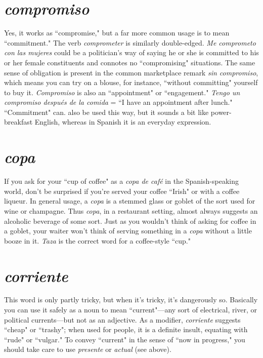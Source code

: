 \section{\emph{compromiso}}

Yes, it works as ``compromise," but a far more
common usage is to mean ``commitment." The verb \emph{comprometer} is
similarly double-edged. \emph{Me comprometo con las mujeres} could be a
politician's way of saying he or she is committed to his or her female
constituents and connotes no ``compromising" situations. The same
sense of obligation is present in the common marketplace remark
\emph{sin compromiso}, which means you can try on a blouse, for instance,
``without committing" yourself to buy it. \emph{Compromiso} is also an
``appointment" or ``engagement." \emph{Tengo un compromiso después de la
	comida} = ``I have an appointment after lunch." ``Commitment" can.
also be used this way, but it sounds a bit like power-breakfast English,
whereas in Spanish it is an everyday expression.

\section{\emph{copa}}

If you ask for your ``cup of coffee" as a \emph{copa de café} in
the Spanish-speaking world, don't be surprised if you're served your
coffee ``Irish" or with a coffee liqueur. In general usage, a \emph{copa} is a
stemmed glass or goblet of the sort used for wine or champagne. Thus
\emph{copa}, in a restaurant setting, almost always suggests an alcoholic beverage of some sort. Just as you wouldn't think of asking for coffee in a
goblet, your waiter won't think of serving something in a \emph{copa} without
a little booze in it. \emph{Taza} is the correct word for a coffee-style ``cup."

\section{\emph{corriente}}

This word is only partly tricky, but when it's
tricky, it's dangerously so. Basically you can use it safely as a noun to
mean ``current"---any sort of electrical, river, or political currents---but not as an adjective. As a modifier, \emph{corriente} suggests ``cheap" or
``trashy"; when used for people, it is a definite insult, equating with
``rude" or ``vulgar." To convey ``current" in the sense of ``now in progress," you should take care to use \emph{presente} or \emph{actual} (see above).

